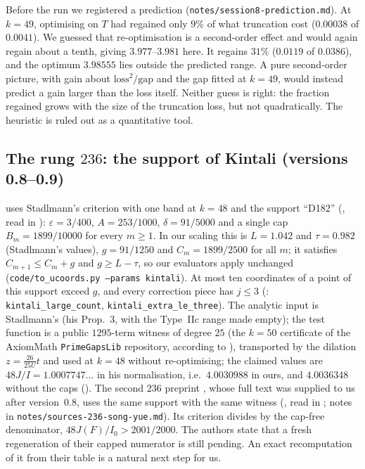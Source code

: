 \begin{remark}\label{rem:prediction}
Before the run we registered a prediction
(\texttt{notes/}\allowbreak\texttt{session8-prediction.md}). At $k=49$, optimising on $T$ had
regained only $9\%$ of what truncation cost ($0.00038$ of $0.0041$). We
guessed that re-optimisation is a second-order effect and would again regain
about a tenth, giving $3.977$--$3.981$ here. It regains $31\%$ ($0.0119$ of
$0.0386$), and the optimum $3.98555$ lies outside the predicted range. A
pure second-order picture, with gain about $\mathrm{loss}^2/\mathrm{gap}$ and
the gap fitted at $k=49$, would instead predict a gain larger than the loss
itself. Neither guess is right: the fraction regained grows with the size of
the truncation loss, but not quadratically. The heuristic is ruled out as a
quantitative tool.
\end{remark}

\subsection*{The rung \texorpdfstring{$236$}{236}: the support of Kintali (versions 0.8--0.9)}
\cite{Kin26} uses Stadlmann's criterion with one band at $k=48$ and the
support ``D182'' (, read in \cite[\S2]{Kin26}):
$\varepsilon=3/400$, $A=253/1000$, $\delta=91/5000$ and a single cap
$B_m=1899/10000$ for every $m\ge1$. In our scaling this is $L=1.042$ and
$\tau=0.982$ (Stadlmann's values), $g=91/1250$ and $C_m=1899/2500$ for all
$m$; it satisfies $C_{m+1}\le C_m+g$ and $g\ge L-\tau$, so our evaluators
apply unchanged (\texttt{code/to\_ucoords.py --params kintali}). At most ten
coordinates of a point of this support exceed $g$, and every correction piece
has $j\le3$ (: \texttt{kintali\_large\_count},
\texttt{kintali\_extra\_le\_three}). The analytic input is Stadlmann's
(his Prop.~3, with the Type~IIc range made empty); the test function is a public
$1295$-term witness of degree $25$ (the $k=50$ certificate of the AxiomMath
\texttt{PrimeGapsLib} repository, according to \cite[\S3]{Kin26}), transported
by the dilation $z=\frac{26}{25U}t$ and used at $k=48$ without re-optimising; the claimed values are
$48J/I=1.0007747\ldots$ in his normalisation, i.e.\ $4.0030988$ in ours,
and $4.0036348$ without the caps (). The second $236$
preprint \cite{SY26}, whose full text was supplied to us after version~0.8,
uses the same support with the same witness (, read in
\cite[\S4]{SY26}; notes in \texttt{notes/}\allowbreak\texttt{sources-236-song-yue.md}).
Its criterion divides by the cap-free denominator, $48J(F)/I_0>2001/2000$.
The authors state that a fresh regeneration of their capped numerator is
still pending. An exact recomputation of it from their table is a natural
next step for us.


